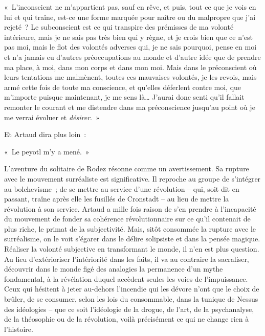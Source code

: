 \documentclass[french,twoside]{book} %
\newenvironment{quoteblock}%
  {\begin{quoting}}
  {\end{quoting}}
\newenvironment{quotebar}{%
    \def\FrameCommand{{\color{rubric!10!}\vrule width 0.5em} \hspace{0.9em}}%
    \def\OuterFrameSep{\itemsep} %
    \MakeFramed {\advance\hsize-\width \FrameRestore}
  }%
  {%
    \endMakeFramed
  }
\renewenvironment{quoteblock}%
  {%
    \savenotes
    \setstretch{0.9}
    \normalfont
    \begin{quotebar}
  }
  {%
    \end{quotebar}
    \spewnotes
  }
\begin{document}
\begin{quoteblock}
\noindent « L’inconscient ne m’appartient pas, sauf en rêve, et puis, tout ce que je vois en lui et qui traîne, est-ce une forme marquée pour naître ou du malpropre que j’ai rejeté ? Le subconscient est ce qui transpire des prémisses de ma volonté intérieure, mais je ne sais pas très bien qui y règne, et je crois bien que ce n’est pas moi, mais le flot des volontés adverses qui, je ne sais pourquoi, pense en moi et n’a jamais eu d’autres préoccupations au monde et d’autre idée que de prendre ma place, à moi, dans mon corps et dans mon moi. Mais dans le préconscient où leurs tentations me malmènent, toutes ces mauvaises volontés, je les revois, mais armé cette fois de toute ma conscience, et qu’elles déferlent contre moi, que m’importe puisque maintenant, je me sens là… J’aurai donc senti qu’il fallait remonter le courant et me distendre dans ma préconscience jusqu’au point où je me verrai évoluer et \emph{désirer}. »\end{quoteblock}

\noindent Et Artaud dira plus loin :\par

\begin{quoteblock}
\noindent « Le peyotl m’y a mené. »\end{quoteblock}

\noindent L’aventure du solitaire de Rodez résonne comme un avertissement. Sa rupture avec le mouvement surréaliste est significative. Il reproche au groupe de s’intégrer au bolchevisme ; de se mettre au service d’une révolution – qui, soit dit en passant, traîne après elle les fusillés de Cronstadt – au lieu de mettre la révolution à son service. Artaud a mille fois raison de s’en prendre à l’incapacité du mouvement de fonder sa cohérence révolutionnaire sur ce qu’il contenait de plus riche, le primat de la subjectivité. Mais, sitôt consommée la rupture avec le surréalisme, on le voit s’égarer dans le délire solipsiste et dans la pensée magique. Réaliser la volonté subjective en transformant le monde, il n’en est plus question. Au lieu d’extérioriser l’intériorité dans les faits, il va au contraire la sacraliser, découvrir dans le monde figé des analogies la permanence d’un mythe fondamental, à la révélation duquel accèdent seules les voies de l’impuissance. Ceux qui hésitent à jeter au-dehors l’incendie qui les dévore n’ont que le choix de brûler, de se consumer, selon les lois du consommable, dans la tunique de Nessus des idéologies – que ce soit l’idéologie de la drogue, de l’art, de la psychanalyse, de la théosophie ou de la révolution, voilà précisément ce qui ne change rien à l’histoire.\par
\end{document}
